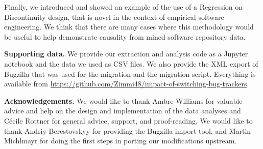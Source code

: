 \documentclass[conference]{IEEEtran}
\begin{document}
Finally, we introduced and showed an example of the use of a Regression on Discontinuity design, that is novel in the context of empirical software engineering. We think that there are many cases where this methodology would be useful to help demonstrate causality from mined software repository data.


\scriptsize
\noindent \footnotesize{\textbf{Supporting data.}}
We provide our extraction and analysis code as a Jupyter notebook and the data we used as CSV files. We also provide the XML export of Bugzilla that was used for the migration and the migration script. Everything is available from \url{https://github.com/Zimmi48/impact-of-switching-bug-trackers}.


\noindent\footnotesize{\textbf{Acknowledgements.}}
We would like to thank Ambre Williams for valuable advice and help on the design and implementation of the data analyses and C\'ecile Rottner for general advice, support, and proof-reading.
We would like to thank Andriy Berestovskyy for providing the Bugzilla import tool, and Martin Michlmayr for doing the first steps in porting our modifications upstream.

%


%
\end{document}
